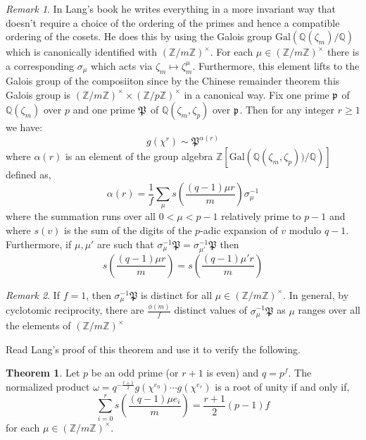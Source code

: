 \documentclass[12pt]{article}
\newcommand{\Gal}[1]{\mathrm{Gal}\left( #1 \right)}
\newcommand{\Z}{\mathbb{Z}}
\newcommand{\Q}{\mathbb{Q}}
\theoremstyle{remark}
\newtheorem*{remark}{Remark}
\theoremstyle{definition}
\newtheorem{theorem}{Theorem}[subsection]
\begin{document}
\begin{remark}
In Lang's book he writes everything in a more invariant way that doesn't require a choice of the ordering of the primes and hence a compatible ordering of the cosets. He does this by using the Galois group $\Gal{\Q(\zeta_m)/\Q}$ which is canonically identified with $(\Z / m \Z)^\times$. For each $\mu \in (\Z / m \Z)^\times$ there is a corresponding $\sigma_\mu$ which acts via $\zeta_m \mapsto \zeta_m^\mu$. Furthermore, this element lifts to the Galois group of the composiiton since by the Chinese remainder theorem this Galois group is $(\Z / m \Z)^\times \times (\Z / p \Z)^\times$ in a canonical way. Fix one prime $\mathfrak{p}$ of $\Q(\zeta_m)$ over $p$ and one prime $\mathfrak{P}$ of $\Q(\zeta_m, \zeta_p)$ over $\mathfrak{p}$.
Then for any integer $r \ge 1$ we have:
\[ g\left(\chi^r\right) \sim \mathfrak{P}^{\alpha(r)}\]
where $\alpha(r)$ is an element of the group algebra $\Z[\Gal{\Q(\zeta_m, \zeta_p))/\Q}]$ defined as,
\[\alpha(r) = \frac{1}{f}\sum_{\mu} s\left(\frac{(q-1)\mu r}{m}\right)\sigma_{\mu}^{-1}\]
where the summation runs over all $0 < \mu < p-1$ relatively prime to $p-1$ and where $s(v)$ is the sum of the digits of the $p$-adic expansion of $v$ modulo $q - 1$. Furthermore, if $\mu, \mu'$ are such that $\sigma_{\mu}^{-1}\mathfrak{P} = \sigma_{\mu'}^{-1}\mathfrak{P}$ then
\[s\left(\frac{(q-1)\mu r}{m}\right) = s\left(\frac{(q-1)\mu' r}{m}\right)\]
\end{remark}


\begin{remark} If $f = 1$, then $\sigma_{\mu}^{-1} \mathfrak{P}$ is distinct for all $\mu\in(\Z/m\Z)^{\times}$. In general, by cyclotomic reciprocity, there are $\frac{\phi(m)}{f}$ distinct values of $\sigma_{\mu}^{-1} \mathfrak{P}$ as $\mu$ ranges over all the elements of $(\Z/m\Z)^{\times}$
\end{remark}

Read Lang's proof of this theorem and use it to verify the following.

\newcommand{\s}[1]{s\left( #1 \right)}
\newcommand{\Pf}{\mathfrak{P}}

\begin{theorem} \label{thm:gauss_sum_is_root_of_unity_ideal_factorization_counting_condition}
Let $p$ be an odd prime (or $r + 1$ is even) and $q = p^f$. The normalized product $\omega = q^{-\frac{r+1}{2}} g(\chi^{e_0}) \cdots g(\chi^{e_r})$ is a root of unity if and only if,
\[ \sum_{i = 0}^r s\left(\frac{(q-1) \mu e_i}{m}\right) = \frac{r+1}{2} (p - 1) f \]
for each $\mu \in (\Z / m \Z)^\times$.
\end{theorem}
\end{document}
